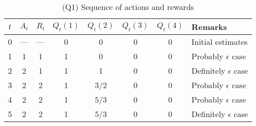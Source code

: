 \begin{table}[h]
    \centering
    \begin{tabular}{cccccccl}
        \toprule
        \( t \) & \( A_{t} \) & \( R_{t} \) & \( Q_{t}(1) \) & \( Q_{t}(2) \) & \( Q_{t}(3) \) & \( Q_{t}(4) \) & Remarks                        \\
        \midrule
        0       & ---         & ---         & 0              & 0              & 0              & 0              & Initial estimates              \\
        1       & 1           & 1           & 1              & 0              & 0              & 0              & Probably \( \epsilon \) case   \\
        2       & 2           & 1           & 1              & 1              & 0              & 0              & Definitely \( \epsilon \) case \\
        3       & 2           & 2           & 1              & 3/2            & 0              & 0              & Probably \( \epsilon \) case   \\
        4       & 2           & 2           & 1              & 5/3            & 0              & 0              & Probably \( \epsilon \) case   \\
        5       & 2           & 2           & 1              & 5/3            & 0              & 0              & Definitely \( \epsilon \) case \\
        \bottomrule
    \end{tabular}
    \caption{(Q1) Sequence of actions and rewards}
\end{table}
